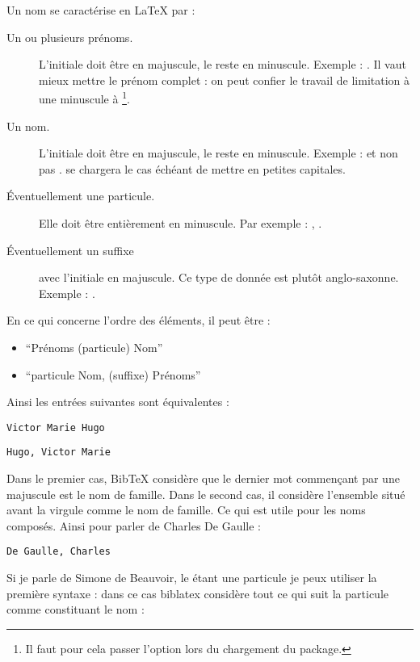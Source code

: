 Un nom se caractérise en LaTeX par :
\begin{description}
	\item[Un ou plusieurs prénoms.]L'initiale doit être en majuscule, le reste en minuscule. Exemple : . Il vaut mieux mettre le prénom complet : on peut confier le travail de limitation à une minuscule  à \footnote{Il faut pour cela passer l'option  lors du chargement du package.}.
	\item[Un nom.]L'initiale doit être en majuscule, le reste en minuscule. Exemple :  et non pas .  se chargera le cas échéant de mettre en petites capitales.
	\item[Éventuellement une particule.]Elle doit être entièrement en minuscule. Par exemple : , .
	\item[Éventuellement un suffixe] avec l'initiale en majuscule. Ce type de donnée est plutôt anglo-saxonne. Exemple : .
\end{description}

En ce qui concerne l'ordre des éléments, il  peut être :
\begin{itemize}
\item\enquote{Prénoms  (particule)  Nom}
\item\enquote{particule Nom, (suffixe) Prénoms} 
\end{itemize}

Ainsi les entrées suivantes sont équivalentes :

\begin{verbatim}
Victor Marie Hugo
\end{verbatim}

\begin{verbatim}
Hugo, Victor Marie
\end{verbatim}

Dans le premier cas, BibTeX considère que le dernier mot commençant par une majuscule est le nom de famille. Dans le second cas, il considère l'ensemble situé avant la virgule comme le nom de famille. Ce qui est utile pour les noms composés. Ainsi pour parler de Charles De Gaulle :

\begin{verbatim}
De Gaulle, Charles
\end{verbatim}

Si je parle de Simone de Beauvoir, le  étant une particule je peux utiliser la première syntaxe : dans ce cas biblatex considère tout ce qui suit la particule comme constituant le nom :

